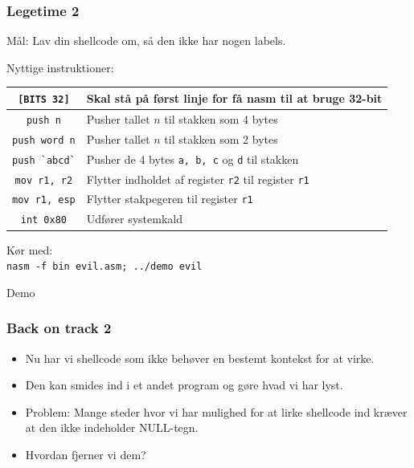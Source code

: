 \documentclass[slidestop,compress,mathserif, xcolor=table]{beamer}
\begin{document}
\begin{frame}[c]
    \frametitle{Legetime 2}

    \pause Mål: Lav din shellcode om, så den ikke har nogen labels. \vskip5pt

    \pause Nyttige instruktioner:

    \begin{tabular}{|c|p{6cm}|}
    \hline
    \texttt{[BITS 32]} & Skal stå på først linje for få nasm til at bruge 32-bit
    \\\hline

    \texttt{push n} & Pusher tallet $n$ til stakken som 4 bytes \\\hline

    \texttt{push word n} & Pusher tallet $n$ til stakken som 2 bytes\\\hline

    \texttt{push \`{}abcd\`{}} & Pusher de 4 bytes \texttt{a, b, c} og
    \texttt{d} til stakken \\\hline

    \texttt{mov r1, r2} & Flytter indholdet af register \texttt{r2} til register
    \texttt{r1} \\\hline

    \texttt{mov r1, esp} & Flytter stakpegeren til register \texttt{r1} \\\hline

    \texttt{int 0x80} & Udfører systemkald \\\hline
    \end{tabular} \vskip5pt

    \pause Kør med: \\\texttt{nasm -f bin evil.asm; ../demo evil}
\end{frame}

\begin{frame}[c]
    \begin{center}
      \Huge Demo
    \end{center}
\end{frame}

\begin{frame}[c]
    \frametitle{Back on track 2}

    \begin{itemize}
      \pause\item Nu har vi shellcode som ikke behøver en bestemt kontekst for
      at virke.

      \pause\item Den kan smides ind i et andet program og gøre hvad vi har
      lyst.

      \pause\item Problem: Mange steder hvor vi har mulighed for at lirke
      shellcode ind kræver at den ikke indeholder NULL-tegn.

        \pause\item Hvordan fjerner vi dem?
    \end{itemize}
\end{frame}
\end{document}
